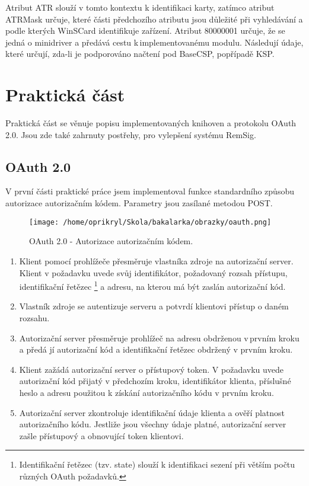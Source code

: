 \documentclass[]{fithesis3}
\begin{document}
		Atribut ATR slouží v tomto kontextu k identifikaci karty, zatímco atribut ATRMask určuje, 			které části předchozího atributu jsou důležité při vyhledávání a podle kterých WinSCard identifikuje zařízení. Atribut 80000001 určuje, že se jedná o minidriver a předává cestu k\,implementovanému modulu. Následují údaje, které určují, zda-li je podporováno načtení pod 		BaseCSP, popřípadě KSP.

\let\cleardoublepage\clearpage

\chapter{Praktická část}

Praktická část se věnuje popisu implementovaných knihoven a protokolu OAuth 2.0. Jsou zde také zahrnuty postřehy, pro vylepšení systému RemSig. 

	\section{OAuth 2.0}

	V první části praktické práce jsem implementoval funkce standardního způsobu autorizace 			autorizačním kódem. Parametry jsou zasílané metodou POST.

	\begin{figure}[!ht]
		\begin{center}
  		\begin{minipage}{0.80\textwidth}
    			\texttt{[image: /home/oprikryl/Skola/bakalarka/obrazky/oauth.png]}
  		\end{minipage}
		\end{center}
 		\caption{OAuth 2.0 - Autorizace autorizačním kódem.}
  		\label{fig:oauth}
	\end{figure}

	\begin{enumerate}
		\item {
		Klient pomocí prohlížeče přesměruje vlastníka zdroje na autorizační server. Klient v 				požadavku uvede svůj identifikátor, požadovaný rozsah přístupu,  identifikační řetězec
			\footnote {
			Identifikační řetězec (tzv. state) slouží k identifikaci sezení při větším počtu různých 				OAuth požadavků.
			}	 
		a adresu, na kterou má být zaslán autorizační kód.
		}
		\item
		Vlastník zdroje se autentizuje serveru a potvrdí klientovi přístup o daném rozsahu.
		\item
		Autorizační server přesměruje prohlížeč na adresu obdrženou v\,prvním kroku a předá jí 			autorizační kód a identifikační řetězec obdržený v prvním kroku.
		\item
		Klient zažádá autorizační server o přístupový token. V požadavku uvede autorizační kód 			přijatý v předchozím kroku, identifikátor klienta, příslušné heslo a adresu použitou k 				získání autorizačního kódu v prvním kroku. 
		\item	
		Autorizační server zkontroluje identifikační údaje klienta a ověří platnost autorizačního 				kódu. Jestliže jsou všechny údaje platné, autorizační server zašle přístupový a obnovující 			token klientovi.

	\end{enumerate}
\end{document}
